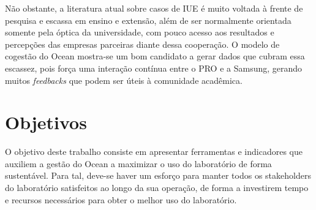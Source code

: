 Não obstante, a literatura atual sobre casos de IUE é muito voltada à frente de pesquisa e escassa em ensino e extensão, além de ser normalmente orientada somente pela óptica da universidade, com pouco acesso aos resultados e percepções das empresas parceiras diante dessa cooperação. O modelo de cogestão do Ocean mostra-se um bom candidato a gerar dados que cubram essa escassez, pois força uma interação contínua entre o PRO e a Samsung, gerando muitos \textit{feedbacks} que podem ser úteis à comunidade acadêmica. 

\section[Objetivos]{Objetivos}
\label{chap:objetivos}

O objetivo deste trabalho consiste em apresentar ferramentas e indicadores que auxiliem a gestão do Ocean a maximizar o uso do laboratório de forma sustentável. Para tal, deve-se haver um esforço para manter todos os stakeholders do laboratório satisfeitos ao longo da sua operação, de forma a investirem tempo e recursos necessários para obter o melhor uso do laboratório.